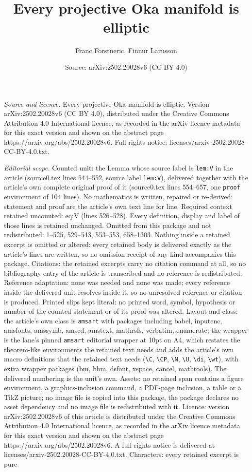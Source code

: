 \documentclass[10pt,a4paper]{amsart}
\title[Every projective Oka manifold is elliptic]{Every projective Oka manifold is elliptic}
\author{Franc Forstneric, Finnur Larusson}
\date{Source: arXiv:2502.20028v6 (CC BY 4.0)}
\begin{document}
\maketitle

\noindent\emph{Source and licence.} Every projective Oka manifold is elliptic. Version arXiv:2502.20028v6 (CC BY 4.0), distributed under the Creative Commons Attribution 4.0 International licence, as recorded in the arXiv licence metadata for this exact version and shown on the abstract page https://arxiv.org/abs/2502.20028v6. Full rights notice: licenses/arxiv-2502.20028-CC-BY-4.0.txt.\par\smallskip

\noindent\textit{Editorial scope.} Counted unit: the Lemma whose source label is \texttt{lem:V} in the article (source0.tex lines 544--552, source label \texttt{lem:V}), delivered together with the article's own complete original proof of it (source0.tex lines 554--657, one \texttt{proof} environment of 104 lines). No mathematics is written, repaired or re-derived: statement and proof are the article's own text line for line. Required context retained uncounted: eq:V (lines 526--528). Every definition, display and label of those lines is retained unchanged. Omitted from this package and not redistributed: 1--525, 529--543, 553--553, 658--1303. Nothing inside a retained excerpt is omitted or altered: every retained body is delivered exactly as the article's lines are written, so no omission receipt of any kind accompanies this package. Citations: the retained excerpts carry no citation command at all, so no bibliography entry of the article is transcribed and no reference is redistributed. Reference adaptation: none was needed and none was made; every reference inside the delivered unit resolves inside it, so no unresolved reference or citation is produced. Printed slips kept literal: no printed word, symbol, hypothesis or number of the counted statement or of its proof was altered. Layout and class: the article's own class is \texttt{amsart} with packages including babel, inputenc, amsfonts, amssymb, amscd, amstext, mathrsfs, verbatim, enumerate; the wrapper is the lane's pinned \texttt{amsart} editorial wrapper at 10pt on A4, which restates the theorem-like environments the retained text needs and adds the article's own macro definitions that the retained text needs (\texttt{\textbackslash C}, \texttt{\textbackslash CP}, \texttt{\textbackslash N}, \texttt{\textbackslash U}, \texttt{\textbackslash di}, \texttt{\textbackslash wt}), with extra wrapper packages (bm, bbm, dsfont, xspace, cancel, mathtools). The delivered numbering is the unit's own. Assets: no retained span contains a figure environment, a graphics-inclusion command, a PDF-page inclusion, a table or a TikZ picture; no image file is copied into this package, the package declares no asset dependency and no image file is redistributed with it. Licence: version arXiv:2502.20028v6 of this article is distributed under the Creative Commons Attribution 4.0 International licence, as recorded in the arXiv licence metadata for this exact version and shown on the abstract page https://arxiv.org/abs/2502.20028v6. A full rights notice is delivered at licenses/arxiv-2502.20028-CC-BY-4.0.txt. Characters: every retained excerpt is pure 
\end{document}
